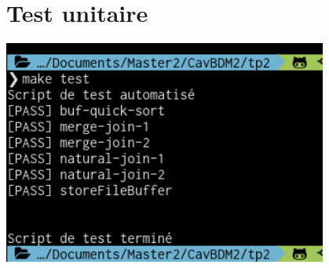 \documentclass[a4paper]{article}
\begin{document}
\section{Test unitaire}


\includegraphics[width=0.8\textwidth]{test.png}




\end{document}
